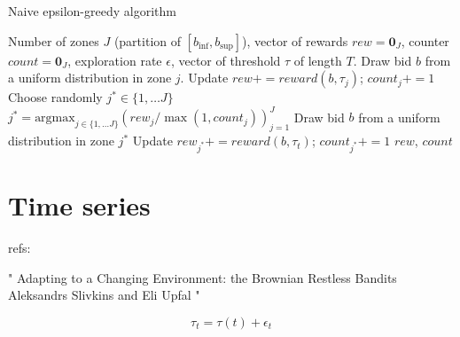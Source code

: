 \documentclass[11pt]{article}
\begin{document}
\begin{algorithm}[H]
  \caption{Naive epsilon-greedy algorithm}
  \label{code:epsilon_greedy}
  \begin{algorithmic}[0]
  \Require Number of zones $J$ (partition of $[b_{\inf}, b_{\sup}]$), vector of rewards $rew = \mathbf{0}_J$, counter $count = \mathbf{0}_J$, exploration rate $\epsilon$,
  vector of threshold $\tau$ of length $T$.
   
  \State Draw bid $b$ from a uniform distribution in zone $j$.
  \State Update $rew += reward(b, \tau_j)$; $count_j += 1$
  \EndFor
   
  \State Choose randomly $j^* \in \{1, \dots J\}$
  \Else {}
  \State $j^* = \text{argmax}_{j \in \{1, \dots J\}} (rew_j / \max(1, count_j))_{j=1}^J$
  \EndIf
  \State Draw bid $b$ from a uniform distribution in zone $j^*$
  \State Update $rew_{j^*} += reward(b, \tau_t)$; $count_{j^*} += 1$
  \EndFor
  \State \Return $rew$, $count$
\end{algorithmic}
\end{algorithm}

\section{Time series}
refs:

"
Adapting to a Changing Environment: the Brownian Restless Bandits
Aleksandrs Slivkins
and Eli Upfal
"

$$\tau_t = \tau(t) + \epsilon_t$$ 
\newpage
%
\end{document}
